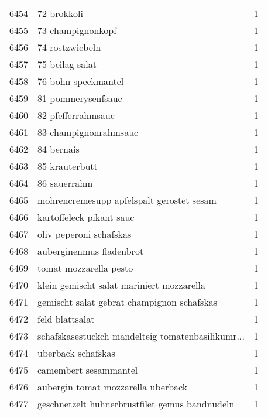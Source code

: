 \begin{tabular}{llr}
6454 &                                        72 brokkoli &      1 \\
6455 &                                  73 champignonkopf &      1 \\
6456 &                                    74 rostzwiebeln &      1 \\
6457 &                                    75 beilag salat &      1 \\
6458 &                                76 bohn speckmantel &      1 \\
6459 &                                 81 pommerysenfsauc &      1 \\
6460 &                                 82 pfefferrahmsauc &      1 \\
6461 &                              83 champignonrahmsauc &      1 \\
6462 &                                         84 bernais &      1 \\
6463 &                                     85 krauterbutt &      1 \\
6464 &                                       86 sauerrahm &      1 \\
6465 &          mohrencremesupp apfelspalt gerostet sesam &      1 \\
6466 &                           kartoffeleck pikant sauc &      1 \\
6467 &                            oliv peperoni schafskas &      1 \\
6468 &                           auberginenmus fladenbrot &      1 \\
6469 &                             tomat mozzarella pesto &      1 \\
6470 &          klein gemischt salat mariniert mozzarella &      1 \\
6471 &         gemischt salat gebrat champignon schafskas &      1 \\
6472 &                                    feld blattsalat &      1 \\
6473 &  schafskasestuckch mandelteig tomatenbasilikumr... &      1 \\
6474 &                                 uberback schafskas &      1 \\
6475 &                              camembert sesammantel &      1 \\
6476 &                 aubergin tomat mozzarella uberback &      1 \\
6477 &     geschnetzelt huhnerbrustfilet gemus bandnudeln &      1 \\

\end{tabular}

